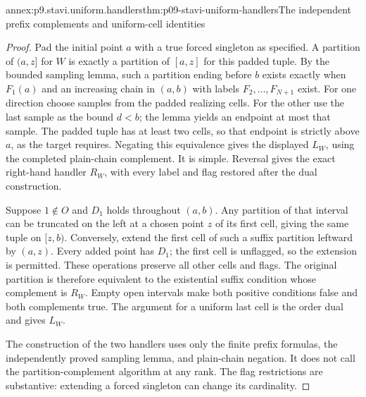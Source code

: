 \begin{annexitem}{annex:p9.stavi.uniform.handlers}{thm:p09-stavi-uniform-handlers}{The independent prefix complements and uniform-cell identities}
\begin{proof}
Pad the initial point \(a\) with a true forced
singleton as specified. A partition of \((a,z]\)
for \(W\) is exactly a partition of \([a,z]\)
for this padded tuple. By the bounded sampling
lemma, such a partition ending before \(b\)
exists exactly when \(F_1(a)\) and
an increasing chain in \((a,b)\) with
labels \(F_2,\ldots,F_{N+1}\) exist.
For one direction choose samples from
the padded realizing cells. For the
other use the last sample as the
bound \(d<b\); the lemma yields an
endpoint at most that sample. The
padded tuple has at least two cells,
so that endpoint is strictly above
\(a\), as the target requires.
Negating this equivalence gives
the displayed \(L_W\), using the
completed plain-chain complement.
It is simple. Reversal gives
the exact right-hand handler
\(R_W\), with every label and
flag restored after the dual
construction.

Suppose \(1\notin O\) and \(D_1\)
holds throughout \((a,b)\).
Any partition of that interval
can be truncated on the left
at a chosen point \(z\) of its
first cell, giving the same
tuple on \([z,b)\).
Conversely, extend the first
cell of such a suffix partition
leftward by \((a,z)\).
Every added point has \(D_1\);
the first cell is unflagged,
so the extension is permitted.
These operations preserve all
other cells and flags.
The original partition is
therefore equivalent to the
existential suffix condition
whose complement is \(R_W\).
Empty open intervals make
both positive conditions
false and both complements
true. The argument for
a uniform last cell is
the order dual and gives
\(L_W\).

The construction of the
two handlers uses only
the finite prefix formulas,
the independently proved
sampling lemma, and
plain-chain negation.
It does not call the
partition-complement
algorithm at any rank.
The flag restrictions
are substantive: extending
a forced singleton can
change its cardinality.
\end{proof}
\end{annexitem}

